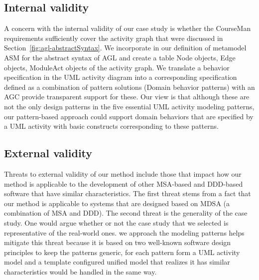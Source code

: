 \subsection{Internal validity}
A concern with the internal validity of our case study is whether the CourseMan requirements sufficiently cover the activity graph that were discussed in Section~\ref{fig:agl-abstractSyntax}. We incorporate in our definition of  metamodel ASM for the abstract syntax of AGL and create a table Node objects, Edge objects, ModuleAct objects of the activity graph.  We translate a behavior specification in the UML activity diagram into a corresponding specification defined as a combination of pattern solutions (Domain behavior patterns) with an AGC provide transparent support for these. Our view is that although these are not the only design patterns in the five essential UML activity modeling patterns, our pattern-based approach could support domain behaviors that are specified by a UML activity with basic constructs corresponding to these patterns.
%
\subsection{External validity}
Threats to external validity of our method include those that impact how our method is applicable to the development of other MSA-based and DDD-based software that have similar characteristics. The first threat stems from a fact that our method is applicable to systems that are designed based on MDSA (a combination of MSA and DDD). The second threat is the generality of the case study. One would argue whether or not the case study that we selected is representative of the real-world ones.
%
we approach the modeling patterns helps mitigate this threat because it is based on two well-known software design principles to keep the patterns generic, for each pattern form a UML activity model and a template configured unified model that realizes it has similar characteristics would be handled in the same way.
